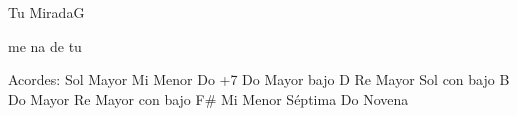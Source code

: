 \documentclass[12pt, spanish]{book}
\begin{document}
\begin{song}{Tu Mirada}{G}
\begin{SBChorus}
            me na de tu 
        \end{SBChorus}


        \ifChordBk
        \begin{SBOpGroup}
            Acordes:\break
            \upchord{\G}\qquad Sol Mayor \hfill
            \upchord{\Em}\qquad Mi Menor \hfill\null\break
            \upchord{\CMaj}\qquad Do +7 \hfill
            \upchord{\CD}\qquad Do Mayor bajo D \hfill\null\break
            \upchord{\D}\qquad Re Mayor \hfill
            \upchord{\GB}\qquad Sol con bajo B \hfill\null\break
            \upchord{\C}\qquad Do Mayor \hfill
            \upchord{\DFs}\qquad Re Mayor con bajo F\# \hfill\null\break
            \upchord{\Emseven}\qquad Mi Menor S\'eptima \hfill
            \upchord{\Cnine}\qquad Do Novena \hfill\null\break
        \end{SBOpGroup}
        \fi
    \end{song}
\end{document}
